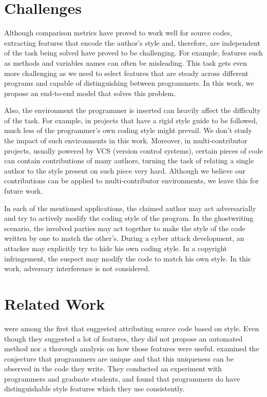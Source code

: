 \section{Challenges}

Although comparison metrics have proved to work well for source codes, extracting features that encode the author's style and, therefore, are independent of the task being solved have proved to be challenging. For example, features such as methods and variables names can often be misleading. This task gets even more challenging as we need to select features that are steady across different programs and capable of distinguishing between programmers. In this work, we propose an end-to-end model that solves this problem.

Also, the environment the programmer is inserted can heavily affect the difficulty of the task. For example, in projects that have a rigid style guide to be followed, much less of the programmer's own coding style might prevail. We don't study the impact of such environments in this work. Moreover, in multi-contributor projects, usually powered by VCS (version control systems), certain pieces of code can contain contributions of many authors, turning the task of relating a single author to the style present on such piece very hard. Although we believe our contributions can be applied to multi-contributor environments, we leave this for future work.

In each of the mentioned applications, the claimed author may act adversarially and try to actively modify the coding style of the program. In the ghostwriting scenario, the involved parties may act together to make the style of the code written by one to match the other's. During a cyber attack development, an attacker may explicitly try to hide his own coding style. In a copyright infringement, the suspect may modify the code to match his own style. In this work, adversary interference is not considered.

\section{Related Work}

 were among the first that suggested attributing source code based on style. Even though they suggested a lot of features, they did not propose an automated method nor a thorough analysis on how those features were useful.  examined the conjecture that programmers are unique and that this uniqueness can be observed in the code they write. They conducted an experiment with programmers and graduate students, and found that programmers do have distinguishable style features which they use consistently.

